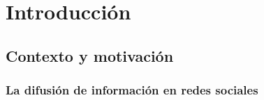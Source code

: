 \documentclass[12pt,twoside,titlepage]{report}
\begin{document}

\pagestyle{fancy}


\renewcommand{\chaptermark}[1]{\markboth{Capítulo \thechapter.\ #1}{}}

\pagestyle{fancy}
\fancyhf{}
\fancyhead[LO]{\leftmark}
\fancyhead[RO]{}
\fancyhead[RE]{\nouppercase\rightmark}
\fancyhead[LE]{}
\fancyfoot[C]{\thepage}










\chapter{Introducción} \label{chap:intro}



\pagestyle{fancy}


\setlength{\parskip}{0.75em}
\renewcommand{\baselinestretch}{1.25}
\setcounter{page}{1}




\section{Contexto y motivación} \label{sec:contexto}


\subsection{La difusión de información en redes sociales} \label{subsec:difusion}

\end{document}
